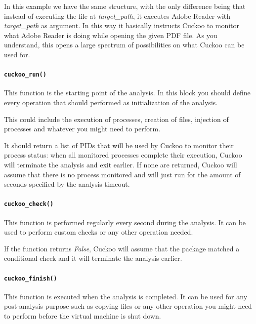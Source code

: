 \documentclass[letterpaper,10pt,english]{sphinxmanual}
\begin{document}
In this example we have the same structure, with the only difference being that
instead of executing the file at \emph{target\_path}, it executes Adobe Reader with
\emph{target\_path} as argument. In this way it basically instructs Cuckoo to monitor
what Adobe Reader is doing while opening the given PDF file. As you understand,
this opens a large spectrum of possibilities on what Cuckoo can be used for.


\paragraph{\texttt{cuckoo\_run()}}
\label{customization/packages:cuckoo-run}\label{customization/packages:id1}
This function is the starting point of the analysis. In this block you
should define every operation that should performed as initialization of the
analysis.

This could include the execution of processes, creation of files, injection of
processes and whatever you might need to perform.

It should return a list of PIDs that will be used by Cuckoo to monitor their
process status: when all monitored processes complete their execution, Cuckoo
will terminate the analysis and exit earlier.
If none are returned, Cuckoo will assume that there is no
process monitored and will just run for the amount of seconds specified by
the analysis timeout.


\paragraph{\texttt{cuckoo\_check()}}
\label{customization/packages:id2}\label{customization/packages:cuckoo-check}
This function is performed regularly every second during the analysis. It can
be used to perform custom checks or any other operation needed.

If the  function returns \emph{False}, Cuckoo will assume that the
package matched a conditional check and it will terminate the analysis earlier.


\paragraph{\texttt{cuckoo\_finish()}}
\label{customization/packages:cuckoo-finish}\label{customization/packages:id3}
This function is executed when the analysis is completed. It can be used for any
post-analysis purpose such as copying files or any other operation you might
need to perform before the virtual machine is shut down.
\end{document}
